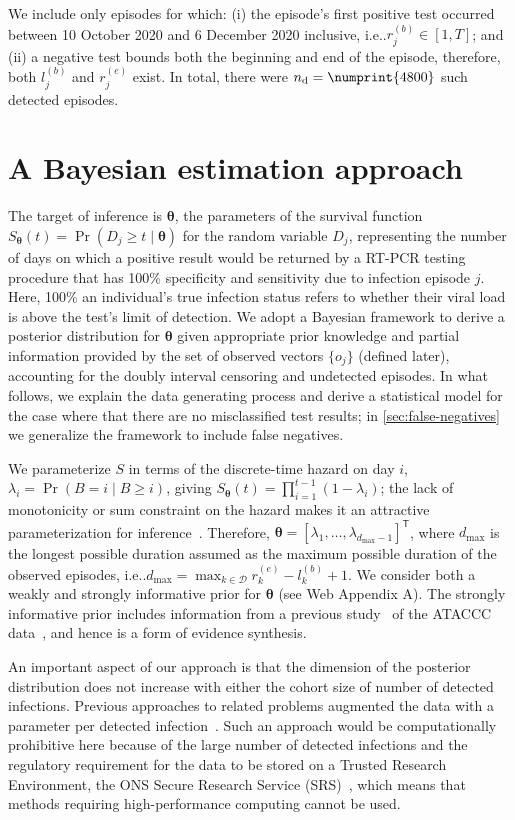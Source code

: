 \documentclass[referee,useAMS,usenatbib]{biom}
\makeatletter
\DeclareMathOperator{\prob}{\mathrm{Pr}}
\newcommand\set{\mathcal}
\renewcommand{\vec}[1]{\bm{#1}}
\newcommand{\dmax}{d_\text{max}}
\newcommand{\ndet}{n_\text{d}}
\DeclareRobustCommand\onedot{\futurelet\@let@token\@onedot}
\def\@onedot{\ifx\@let@token.\else.\null\fi\xspace}
\def\ie{i.e\onedot} \def\Ie{{I.e}\onedot}
\makeatother
\begin{document}
We include only episodes for which: (i) the episode's first positive test occurred between 10 October 2020 and 6 December 2020 inclusive, \ie $r_j^{(b)} \in [1, T]$; and (ii) a negative test bounds both the beginning and end of the episode,
therefore, both $l_j^{(b)}$ and $r_j^{(e)}$ exist.
In total, there were $\ndet = \numprint{4800}$ such detected episodes.


\section{A Bayesian estimation approach} \label{sec:modelling}

The target of inference is $\vec{\theta}$, the parameters of the survival function $S_{\vec{\theta}}(t) = \prob(D_j \geq t \mid \vec\theta)$ for the random variable $D_j$, representing the number of days on which a positive result would be returned by a RT-PCR testing procedure that has 100\% specificity and sensitivity due to infection episode $j$.
Here, 100\% an individual's true infection status refers to whether their viral load is above the test's limit of detection.
We adopt a Bayesian framework to derive a posterior distribution for $\vec{\theta}$ given appropriate prior knowledge and partial information provided by the set of observed vectors $\{ o_j \}$ (defined later), accounting for the doubly interval censoring and undetected episodes.
In what follows, we explain the data generating process and derive a statistical model for the case where that there are no misclassified test results; in \cref{sec:false-negatives} we generalize the framework to include false negatives.

We parameterize $S$ in terms of the discrete-time hazard on day $i$, $\lambda_i = \prob(B = i \mid B \geq i)$, giving $S_{\vec{\theta}}(t) = \prod_{i=1}^{t-1} (1 - \lambda_{i})$; the lack of monotonicity or sum constraint on the hazard makes it an attractive parameterization for inference~\citep{heBayesian}.
Therefore, $\vec{\theta} = [\lambda_1, \dots, \lambda_{\dmax-1}]^{\mathsf{T}}$, where $\dmax$ is the longest possible duration assumed as the maximum possible duration of the observed episodes, \ie $\dmax = \max_{k \in \set{D}} r^{(e)}_k - l^{(b)}_k + 1$.
We consider both a weakly and strongly informative prior for $\vec{\theta}$ (see Web Appendix A).
The strongly informative prior includes information from a previous study~\citep{blakeThesis} of the ATACCC data~\citep{hakkiOnset}, and hence is a form of evidence synthesis.


An important aspect of our approach is that the dimension of the posterior distribution does not increase with either the cohort size of number of detected infections.
Previous approaches to related problems augmented the data with a parameter per detected infection~\citep{heBayesiana,heBayesian,caoModeling}.
Such an approach would be computationally prohibitive here because of the large number of detected infections and the regulatory requirement for the data to be stored on a Trusted Research Environment, the ONS Secure Research Service (SRS)~\citep{onsSRS}, which means that methods requiring high-performance computing cannot be used.
\end{document}
